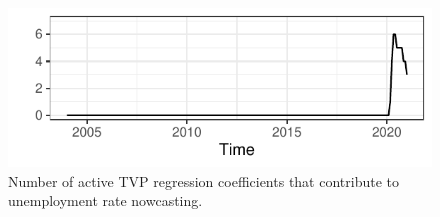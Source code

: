 \documentclass[
  12pt,
]{book}
\theoremstyle{break}
\theoremstyle{nonumberplain}
\begin{document}
\begin{figure}[H]

{\centering \includegraphics{Dynamic-Shrinkage-in-Bayesian-Structural-Time-Series-and-Vector-Autoregressive-Models_files/figure-latex/myfig19-1} 

}

\caption{Number of active TVP regression coefficients that contribute to unemployment rate nowcasting.}\label{fig:myfig19}
\end{figure}
\end{document}
